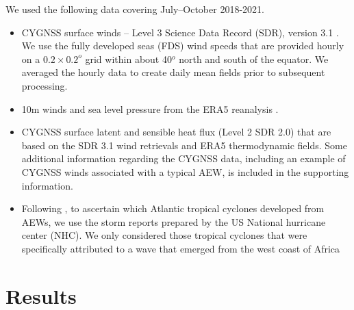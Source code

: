 \documentclass[draft]{agujournal2019}
\begin{document}
We used the following data covering July--October 2018-2021. 
\begin{itemize}
\item CYGNSS surface winds -- Level 3 Science Data Record (SDR), version 3.1 \cite{2016BAMS}. We use the fully developed seas (FDS) wind speeds that are provided hourly on a $0.2 \times 0.2^o$ grid within about 40$^o$ north and south of the equator. We averaged the hourly data to create daily mean fields prior to subsequent processing. 

\item 10m winds and sea level pressure from the ERA5 reanalysis \cite{era5}.

\item  CYGNSS surface latent and sensible heat flux (Level 2 SDR 2.0) that are based on the SDR 3.1 wind retrievals and ERA5 thermodynamic fields. Some additional information regarding the CYGNSS data, including an example of CYGNSS winds associated with a typical AEW,  is included in the supporting information. 
\item Following , to ascertain which Atlantic tropical cyclones developed from AEWs, we use the storm reports prepared by the US National hurricane center (NHC). We only considered those tropical cyclones that were specifically attributed to a wave that emerged from the west coast of Africa


\end{itemize}






\section{Results}
\end{document}
